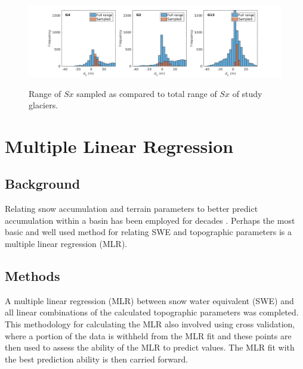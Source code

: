 \documentclass[12pt]{article}
\begin{document}
\begin{landscape}
\begin{figure}
	\centering
	\includegraphics[height = 0.4\textwidth]{SampledRangeTopo_Sx.png}\\
	\caption{Range of $Sx$ sampled as compared to total range of $Sx$ of study glaciers.}
	\label{sampledRange:Sx}
\end{figure}

\end{landscape}


\section{Multiple Linear Regression}
\label{sec:MLR}

\subsection{Background}

Relating snow accumulation and terrain parameters to better predict accumulation within a basin has been employed for decades \citep[][e.g.]{Woo1978, Molotch2005, McGrath2015}. Perhaps the most basic and well used method for relating SWE and topographic parameters is a multiple linear regression (MLR).  

\subsection{Methods}

A multiple linear regression (MLR) between snow water equivalent (SWE) and all linear combinations of the calculated topographic parameters was completed. This methodology for calculating the MLR also involved using cross validation, where a portion of the data is withheld from the MLR fit and these points are then used to assess the ability of the MLR to predict values. The MLR fit with the best prediction ability is then carried forward. 
\end{document}
